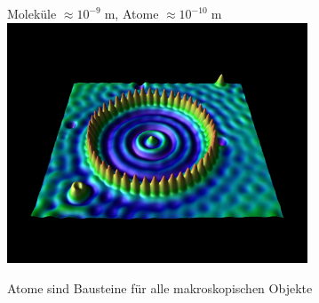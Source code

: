 \documentclass{beamer}
\newcommand{\m}{\ensuremath{\;\text{m}}\xspace}
\begin{document}
\begin{frame}
\begin{columns}[T]
\begin{column}{0.25\textwidth}
{      }
    \end{column}
    \begin{column}{0.75\textwidth}
      \centering
      Molek\"ule $\approx10^{-9}\m$, Atome $\approx10^{-10}\m$
      \includegraphics[width=0.7\textwidth]{matter/quantum_corral_nise.jpg}\\
      \vskip0.2cm
      \begin{block}{}
        \centering
        \alert{Atome sind Bausteine f\"ur alle makroskopischen Objekte}
      \end{block}
    \end{column}
  \end{columns}
\end{frame}
\end{document}
